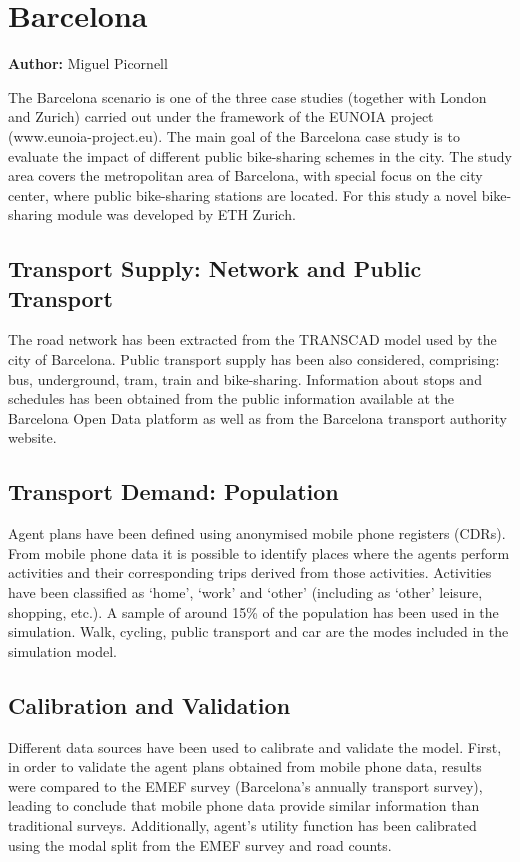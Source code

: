 \section{Barcelona}
\label{sec:barcelona}
\hfill \textbf{Author:} Miguel Picornell

The Barcelona scenario is one of the three case studies (together with London and Zurich) carried out under the framework of the EUNOIA project (www.eunoia-project.eu). The main goal of the Barcelona case study is to evaluate the impact of different public bike-sharing schemes in the city. The study area covers the metropolitan area of Barcelona, with special focus on the city center, where public bike-sharing stations are located. For this study a novel bike-sharing module was developed by ETH Zurich.

\subsection{Transport Supply: Network and Public Transport}
The road network has been extracted from the TRANSCAD model used by the city of Barcelona.  Public transport supply has been also considered, comprising: bus, underground, tram, train and bike-sharing. Information about stops and schedules has been obtained from the public information available at the Barcelona Open Data platform as well as from the Barcelona transport authority website. 

\subsection{Transport Demand: Population} 
Agent plans have been defined using anonymised mobile phone registers (CDRs). From mobile phone data it is possible to identify places where the agents perform activities and their corresponding trips derived from those activities. Activities have been classified as ‘home’, ‘work’ and ‘other’ (including as ‘other’ leisure, shopping, etc.). A sample of around 15\% of the population has been used in the simulation. Walk, cycling, public transport and car are the modes included in the simulation model.

\subsection{Calibration and Validation}
Different data sources have been used to calibrate and validate the model. First, in order to validate the agent plans obtained from mobile phone data, results were compared to the EMEF survey (Barcelona’s annually transport survey), leading to conclude that mobile phone data provide similar information than traditional surveys. Additionally, agent’s utility function has been calibrated using the modal split from the EMEF survey and road counts.

